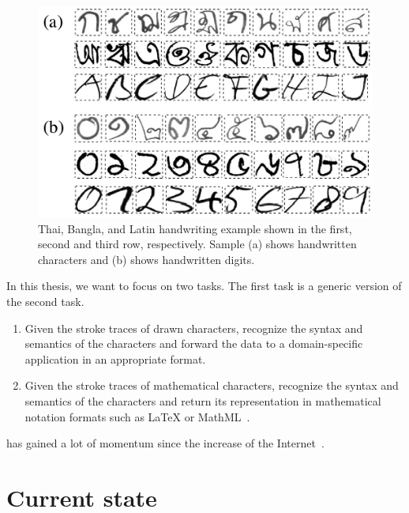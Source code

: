 \begin{figure}[!h]
  \begin{center}
    \includegraphics{img/thai-bangla-latin-handwriting.png}
    \caption{
      Thai, Bangla, and Latin handwriting example shown in the first, second and third row, respectively.
      Sample (a) shows handwritten characters and (b) shows handwritten digits.
    }
    \label{fig:tbl-examples}
  \end{center}
\end{figure}

In this thesis, we want to focus on two tasks. The first task is a generic version of the second task.
\begin{enumerate}
  \item Given the stroke traces of drawn characters, recognize the syntax and semantics of the characters and forward the data to a domain-specific application in an appropriate format.
  \item Given the stroke traces of mathematical characters, recognize the syntax and semantics of the characters and return its representation in mathematical notation formats such as \LaTeX{} or MathML~\cite{MathML}.
\end{enumerate}
has gained a lot of momentum since the increase of the Internet~\cite{chan2000mathematical}.



\section{Current state}
%

